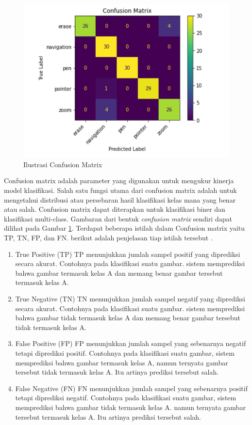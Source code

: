 \begin{figure} [ht] \centering  
  \includegraphics[scale=0.6]{gambar/confussion-matrix.png}
  \caption{Ilustrasi Confusion Matrix}
  \label{fig:Ilustrasi Confusion Matrix}
\end{figure}

Confusion matrix adalah parameter yang digunakan untuk mengukur kinerja model klasifikasi. Salah satu fungsi utama dari confusion matrix adalah untuk mengetahui distribusi atau persebaran hasil klasifikasi kelas mana yang benar atau salah. Confusion matrix dapat diterapkan untuk klasifikasi biner dan klasifikasi multi-class. Gambaran dari bentuk \emph{confusion matrix} sendiri dapat dilihat pada Gambar \ref{fig:Ilustrasi Confusion Matrix}. Terdapat beberapa istilah dalam Confusion matrix yaitu TP, TN, FP, dan FN. berikut adalah penjelasan tiap istilah tersebut \parencite{MohammadReza}.

\begin{enumerate}[nolistsep]
  \item True Positive (TP)
  TP menunjukkan jumlah sampel positif yang diprediksi secara akurat. Contohnya pada klasifikasi suatu gambar. sistem memprediksi bahwa gambar termasuk kelas A dan memang benar gambar tersebut termasuk kelas A.
  \item True Negative (TN)
  TN menunjukkan jumlah sampel negatif yang diprediksi secara akurat. Contohnya pada klasifikasi suatu gambar. sistem memprediksi bahwa gambar tidak termasuk kelas A dan memang benar gambar tersebut tidak termasuk kelas A.
  \item False Positive (FP)
  FP menunjukkan jumlah sampel yang sebenarnya negatif tetapi diprediksi positif. Contohnya pada klasifikasi suatu gambar, sistem memprediksi bahwa gambar termasuk kelas A, namun ternyata gambar tersebut tidak termasuk kelas A. Itu artinya prediksi tersebut salah.
  \item False Negative (FN)
  FN menunjukkan jumlah sampel yang sebenarnya positif tetapi diprediksi negatif. Contohnya pada klasifikasi suatu gambar, sistem memprediksi bahwa gambar tidak termasuk kelas A. namun ternyata gambar tersebut termasuk kelas A. Itu artinya prediksi tersebut salah.
\end{enumerate}   

